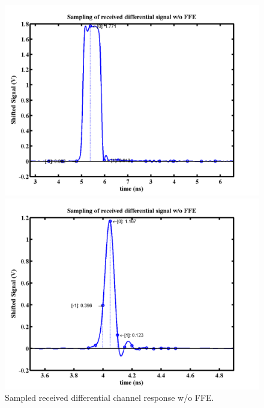\documentclass{book}  %
\begin{document}
\begin{paper}
\begin{figure}[htbp!]
	\centering	
	\begin{minipage}[tb]{0.5\textwidth}
		\centering	
		\includegraphics[width=\textwidth]{./img/Verilog/3G/2_sampling.png}
	\end{minipage}%
	\begin{minipage}[tb]{0.5\textwidth}
		\centering	
		\includegraphics[width=\textwidth]{./img/Verilog/20G/2_sampling.png}
	\end{minipage}%
	\caption{Sampled received differential channel response w/o FFE.}
\end{figure}


\end{paper}
\end{document}
